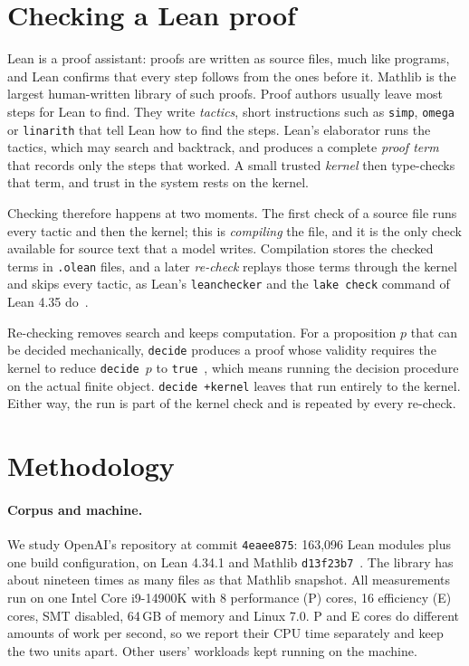 \documentclass[10pt,twocolumn]{article}
\newcommand{\dk}{\texttt{decide +kernel}}
\begin{document}
\section{Checking a Lean proof}\label{sec:background}
Lean is a proof assistant: proofs are written as source files, much like
programs, and Lean confirms that every step follows from the ones before
it. Mathlib is the largest human-written library of such proofs. Proof
authors usually leave most steps for Lean to find. They write \emph{tactics}, short
instructions such as \texttt{simp}, \texttt{omega} or \texttt{linarith} that
tell Lean how to find the steps. Lean's elaborator runs the tactics, which
may search and backtrack, and produces a complete \emph{proof term} that
records only the steps that worked. A small trusted \emph{kernel} then
type-checks that term, and trust in the system rests on the kernel.

Checking therefore happens at two moments. The first check of a source
file runs every tactic and then the kernel; this is \emph{compiling} the
file, and it is the only check available for source text that a model
writes. Compilation stores the checked terms in \texttt{.olean} files, and
a later \emph{re-check} replays those terms through the kernel and skips
every tactic, as Lean's \texttt{leanchecker} and the
\texttt{lake check} command of Lean 4.35 do~\cite{leanCheckerDocs,lean435Check}.

Re-checking removes search and keeps computation. For a proposition $p$ that
can be decided mechanically, \texttt{decide} produces a proof whose
validity requires the kernel to reduce \texttt{decide $p$} to
\texttt{true}~\cite{leanDecide434}, which means running the decision
procedure on the actual finite object. \dk{} leaves that run entirely to
the kernel. Either way, the run is part of the kernel check and is repeated
by every re-check.

\section{Methodology}\label{sec:method}
\paragraph{Corpus and machine.}
We study OpenAI's repository at commit \texttt{4eaee875}: 163,096 Lean
modules plus one build configuration, on Lean 4.34.1 and Mathlib
\texttt{d13f23b7}~\cite{openaiMathSource,mathlibD13fSource2026}. The
library has about nineteen times as many files as that Mathlib snapshot.
All measurements run on one Intel Core i9-14900K with 8 performance (P)
cores, 16 efficiency (E) cores, SMT disabled, 64\,GB of memory and Linux 7.0. P
and E cores do different amounts of work per second, so we report their
CPU time separately and keep the two units apart. Other users'
workloads kept running on the machine.
\end{document}
